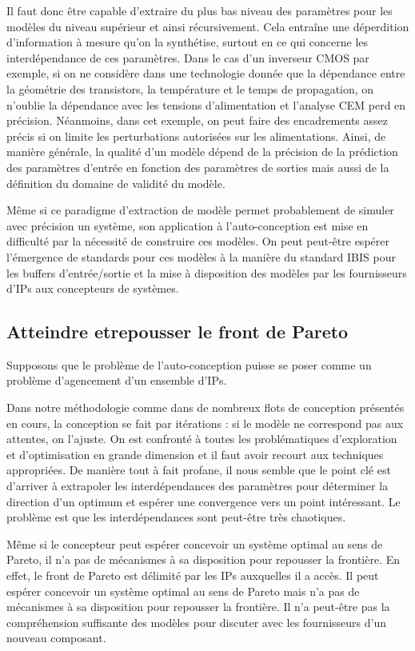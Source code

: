 \documentclass[11pt]{article}
\begin{document}
Il faut donc être capable d'extraire du plus bas niveau des paramètres pour les modèles du niveau supérieur et ainsi récursivement. Cela entraîne une déperdition d'information à mesure qu'on la synthétise, surtout en ce qui concerne les interdépendance de ces paramètres. Dans le cas d'un inverseur CMOS par exemple, si on ne considère dans une technologie donnée que la dépendance entre la géométrie des transistors, la température et le temps de propagation, on n'oublie la dépendance avec les tensions d'alimentation et l'analyse CEM perd en précision. Néanmoins, dans cet exemple, on peut faire des encadrements assez précis si on limite les perturbations autorisées sur les alimentations. Ainsi, de manière générale, la qualité d'un modèle dépend de la précision de la prédiction des paramètres d'entrée en fonction des paramètres de sorties mais aussi de la définition du domaine de validité du modèle.

Même si ce paradigme d'extraction de modèle permet probablement de simuler avec précision un système, son application à l'auto-conception est mise en difficulté par la nécessité de construire ces modèles. On peut peut-être espérer l'émergence de standards pour ces modèles à la manière du standard IBIS pour les buffers d'entrée/sortie et la mise à disposition des modèles par les fournisseurs d'IPs aux concepteurs de systèmes.

\subsection{Atteindre etrepousser le front de Pareto}

Supposons que le problème de l'auto-conception puisse se poser comme un problème d'agencement d'un ensemble d'IPs.

Dans notre méthodologie comme dans de nombreux flots de conception présentés en cours, la conception se fait par itérations : si le modèle ne correspond pas aux attentes, on l'ajuste. On est confronté à toutes les problématiques d'exploration et d'optimisation en grande dimension et il faut avoir recourt aux techniques appropriées. De manière tout à fait profane, il nous semble que le point clé est d'arriver à extrapoler les interdépendances des paramètres pour déterminer la direction d'un optimum et espérer une convergence vers un point intéressant. Le problème est que les interdépendances sont peut-être très chaotiques.

Même si le concepteur peut espérer concevoir un système optimal au sens de Pareto, il n'a pas de mécanismes à sa disposition pour repousser la frontière. En effet, le front de Pareto est délimité par les IPs auxquelles il a accès. Il peut espérer concevoir un système optimal au sens de Pareto mais n'a pas de mécanismes à sa disposition pour repousser la frontière. Il n'a peut-être pas la compréhension suffisante des modèles pour discuter avec les fournisseurs d'un nouveau composant.
\end{document}
